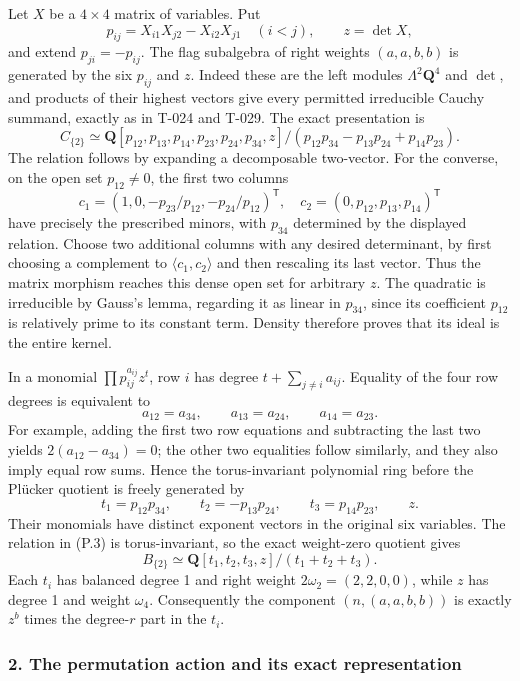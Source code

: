 \documentclass[
  10pt,
]{article}
\begin{document}
Let \(X\) be a \(4\times4\) matrix of variables. Put \[
p_{ij}=X_{i1}X_{j2}-X_{i2}X_{j1}\quad(i<j),\qquad z=\det X,
\] and extend \(p_{ji}=-p_{ij}\). The flag subalgebra of right weights
\((a,a,b,b)\) is generated by the six \(p_{ij}\) and \(z\). Indeed these
are the left modules \(\Lambda^2\mathbf Q^4\) and \(\det\), and products
of their highest vectors give every permitted irreducible Cauchy
summand, exactly as in T-024 and T-029. The exact presentation is \[
C_{\{2\}}\simeq
\mathbf Q[p_{12},p_{13},p_{14},p_{23},p_{24},p_{34},z]
/(p_{12}p_{34}-p_{13}p_{24}+p_{14}p_{23}).
\tag{P.3}
\] The relation follows by expanding a decomposable two-vector. For the
converse, on the open set \(p_{12}\ne0\), the first two columns \[
c_1=(1,0,-p_{23}/p_{12},-p_{24}/p_{12})^\mathsf T,
\quad c_2=(0,p_{12},p_{13},p_{14})^\mathsf T
\] have precisely the prescribed minors, with \(p_{34}\) determined by
the displayed relation. Choose two additional columns with any desired
determinant, by first choosing a complement to
\(\langle c_1,c_2\rangle\) and then rescaling its last vector. Thus the
matrix morphism reaches this dense open set for arbitrary \(z\). The
quadratic is irreducible by Gauss's lemma, regarding it as linear in
\(p_{34}\), since its coefficient \(p_{12}\) is relatively prime to its
constant term. Density therefore proves that its ideal is the entire
kernel.

In a monomial \(\prod p_{ij}^{a_{ij}}z^t\), row \(i\) has degree
\(t+\sum_{j\ne i}a_{ij}\). Equality of the four row degrees is
equivalent to \[
a_{12}=a_{34},\qquad a_{13}=a_{24},\qquad a_{14}=a_{23}.
\tag{P.4}
\] For example, adding the first two row equations and subtracting the
last two yields \(2(a_{12}-a_{34})=0\); the other two equalities follow
similarly, and they also imply equal row sums. Hence the torus-invariant
polynomial ring before the Plücker quotient is freely generated by \[
t_1=p_{12}p_{34},\qquad
t_2=-p_{13}p_{24},\qquad
t_3=p_{14}p_{23},\qquad z.
\tag{P.5}
\] Their monomials have distinct exponent vectors in the original six
variables. The relation in (P.3) is torus-invariant, so the exact
weight-zero quotient gives \[
\boxed{B_{\{2\}}\simeq\mathbf Q[t_1,t_2,t_3,z]/(t_1+t_2+t_3).}
\tag{P.6}
\] Each \(t_i\) has balanced degree 1 and right weight
\(2\omega_2=(2,2,0,0)\), while \(z\) has degree 1 and weight
\(\omega_4\). Consequently the component \((n,(a,a,b,b))\) is exactly
\(z^b\) times the degree-\(r\) part in the \(t_i\).

\subsubsection{2. The permutation action and its exact
representation}\label{the-permutation-action-and-its-exact-representation}
\end{document}
